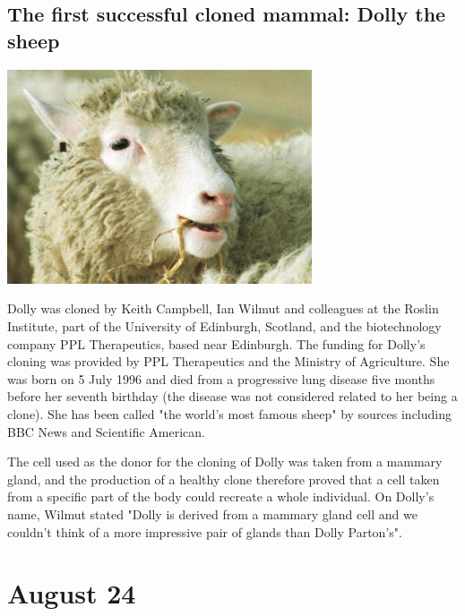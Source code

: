 \documentclass[11pt]{report}
\begin{document}
\subsection{The first successful cloned mammal: Dolly the sheep}
\vspace{2mm}\begin{center}\includegraphics[width=9cm]{./img/dollySheep.jpg}\end{center}
Dolly was cloned by Keith Campbell, Ian Wilmut and colleagues at the Roslin Institute, part of the University of Edinburgh, Scotland, and the biotechnology company PPL Therapeutics, based near Edinburgh. The funding for Dolly's cloning was provided by PPL Therapeutics and the Ministry of Agriculture. She was born on 5 July 1996 and died from a progressive lung disease five months before her seventh birthday (the disease was not considered related to her being a clone). She has been called "the world's most famous sheep" by sources including BBC News and Scientific American.

The cell used as the donor for the cloning of Dolly was taken from a mammary gland, and the production of a healthy clone therefore proved that a cell taken from a specific part of the body could recreate a whole individual. On Dolly's name, Wilmut stated "Dolly is derived from a mammary gland cell and we couldn't think of a more impressive pair of glands than Dolly Parton's".

\section{August 24}
\end{document}
